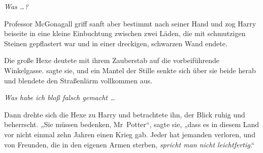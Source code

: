 \emph{Was …? }

Professor McGonagall griff sanft aber bestimmt nach seiner Hand und zog Harry beiseite in eine kleine Einbuchtung zwischen zwei Läden, die mit schmutzigen Steinen gepflastert war und in einer dreckigen, schwarzen Wand endete.

Die große Hexe deutete mit ihrem Zauberstab auf die vorbeiführende Winkelgasse.  sagte sie, und ein Mantel der Stille senkte sich über sie beide herab und blendete den Straßenlärm vollkommen aus.

\emph{Was habe ich bloß falsch gemacht …}

Dann drehte sich die Hexe zu Harry und betrachtete ihn, der Blick ruhig und beherrscht.
„Sie müssen bedenken, Mr~Potter“, sagte sie, „dass es in diesem Land vor nicht einmal zehn Jahren einen Krieg gab. Jeder hat jemanden verloren, und von Freunden, die in den eigenen Armen sterben, \emph{spricht man nicht leichtfertig}.“

